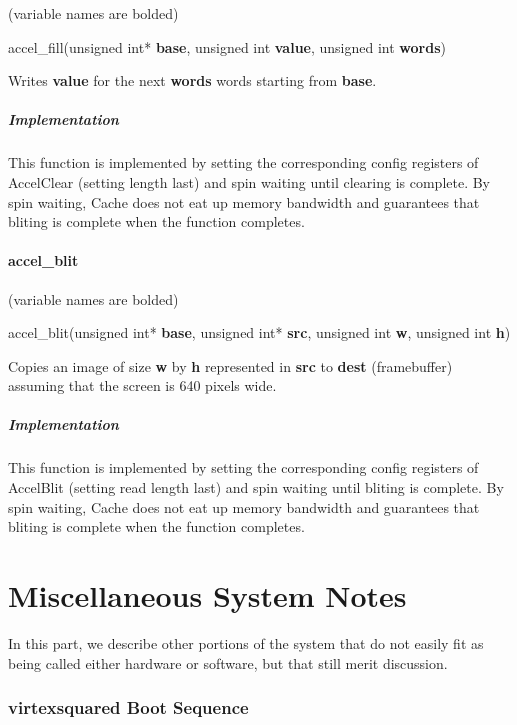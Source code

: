 \documentclass[10pt]{article}
\begin{document}
(variable names are bolded)

accel\_fill(unsigned int* \textbf{base}, unsigned int \textbf{value}, unsigned int \textbf{words})

Writes \textbf{value} for the next \textbf{words} words starting from \textbf{base}.

\subsubsection{Implementation}

This function is implemented by setting the corresponding config registers of AccelClear (setting length last) and spin waiting until clearing is complete. By spin waiting, Cache does not eat up memory bandwidth and guarantees that bliting is complete when the function completes.

\subsection{accel\_blit}

(variable names are bolded)

accel\_blit(unsigned int* \textbf{base}, unsigned int* \textbf{src}, unsigned int \textbf{w},
            unsigned int \textbf{h})

Copies an image of size \textbf{w} by \textbf{h} represented in \textbf{src} to \textbf{dest} 
(framebuffer) assuming that the screen is 640 pixels wide.

\subsubsection{Implementation}

This function is implemented by setting the corresponding config registers of AccelBlit (setting read length last) and spin waiting until bliting is complete. By spin waiting, Cache does not eat up memory bandwidth and guarantees that bliting is complete when the function completes. 

\part{Miscellaneous System Notes}

In this part, we describe other portions of the system that do not easily
fit as being called either hardware or software, but that still merit
discussion.

\section{virtexsquared Boot Sequence}
\label{sec:boot}
\end{document}

